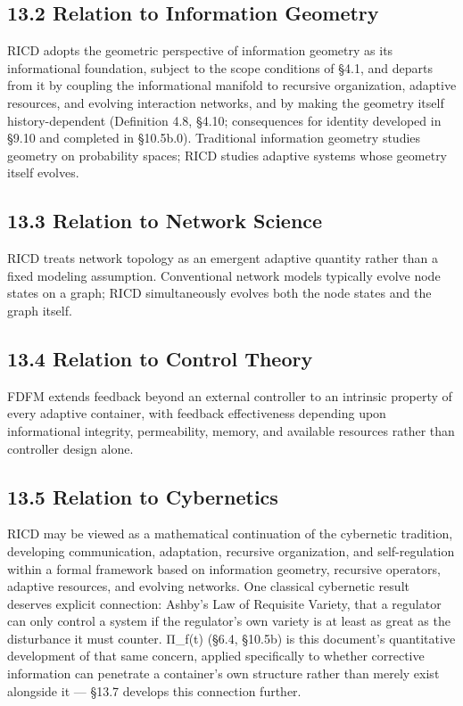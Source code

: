 \documentclass[
]{article}
\begin{document}
\hypertarget{relation-to-information-geometry}{%
\subsection{13.2 Relation to Information
Geometry}\label{relation-to-information-geometry}}

RICD adopts the geometric perspective of information geometry as its
informational foundation, subject to the scope conditions of §4.1, and
departs from it by coupling the informational manifold to recursive
organization, adaptive resources, and evolving interaction networks, and
by making the geometry itself history-dependent (Definition 4.8, §4.10;
consequences for identity developed in §9.10 and completed in §10.5b.0).
Traditional information geometry studies geometry on probability spaces;
RICD studies adaptive systems whose geometry itself evolves.

\hypertarget{relation-to-network-science}{%
\subsection{13.3 Relation to Network
Science}\label{relation-to-network-science}}

RICD treats network topology as an emergent adaptive quantity rather
than a fixed modeling assumption. Conventional network models typically
evolve node states on a graph; RICD simultaneously evolves both the node
states and the graph itself.

\hypertarget{relation-to-control-theory}{%
\subsection{13.4 Relation to Control
Theory}\label{relation-to-control-theory}}

FDFM extends feedback beyond an external controller to an intrinsic
property of every adaptive container, with feedback effectiveness
depending upon informational integrity, permeability, memory, and
available resources rather than controller design alone.

\hypertarget{relation-to-cybernetics}{%
\subsection{13.5 Relation to
Cybernetics}\label{relation-to-cybernetics}}

RICD may be viewed as a mathematical continuation of the cybernetic
tradition, developing communication, adaptation, recursive organization,
and self-regulation within a formal framework based on information
geometry, recursive operators, adaptive resources, and evolving
networks. One classical cybernetic result deserves explicit connection:
Ashby's Law of Requisite Variety, that a regulator can only control a
system if the regulator's own variety is at least as great as the
disturbance it must counter. Π\_f(t) (§6.4, §10.5b) is this document's
quantitative development of that same concern, applied specifically to
whether corrective information can penetrate a container's own structure
rather than merely exist alongside it --- §13.7 develops this connection
further.
\end{document}
